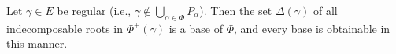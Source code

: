 Let $\gamma \in E$ be regular (i.e., $\gamma \notin \bigcup_{\alpha \in \Phi} P_\alpha$). Then the set $\Delta(\gamma)$ of all indecomposable roots in $\Phi^+(\gamma)$ is a base of $\Phi$, and every base is obtainable in this manner.